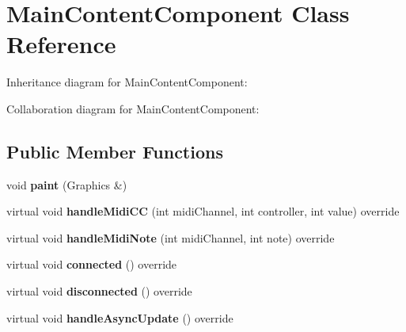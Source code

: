 \hypertarget{class_main_content_component}{}\section{Main\+Content\+Component Class Reference}
\label{class_main_content_component}


Inheritance diagram for Main\+Content\+Component\+:


Collaboration diagram for Main\+Content\+Component\+:
\subsection*{Public Member Functions}
\begin{DoxyCompactItemize}
\item 
void {\bfseries paint} (Graphics \&)\hypertarget{class_main_content_component_a897ff27920dedae2b120fe4e6a198815}{}\label{class_main_content_component_a897ff27920dedae2b120fe4e6a198815}

\item 
virtual void {\bfseries handle\+Midi\+CC} (int midi\+Channel, int controller, int value) override\hypertarget{class_main_content_component_a156f68ecd352b481d8ab6b9daeeb1917}{}\label{class_main_content_component_a156f68ecd352b481d8ab6b9daeeb1917}

\item 
virtual void {\bfseries handle\+Midi\+Note} (int midi\+Channel, int note) override\hypertarget{class_main_content_component_a45a06f0b1ac2b7f97d759f70be3cc1d8}{}\label{class_main_content_component_a45a06f0b1ac2b7f97d759f70be3cc1d8}

\item 
virtual void {\bfseries connected} () override\hypertarget{class_main_content_component_a17a320849296be1f080bb24d92c069e4}{}\label{class_main_content_component_a17a320849296be1f080bb24d92c069e4}

\item 
virtual void {\bfseries disconnected} () override\hypertarget{class_main_content_component_a06efe52a519e42c8f1170a3035a160d6}{}\label{class_main_content_component_a06efe52a519e42c8f1170a3035a160d6}

\item 
virtual void {\bfseries handle\+Async\+Update} () override\hypertarget{class_main_content_component_a9be726b895f68c0e9163d618ee4d20f6}{}\label{class_main_content_component_a9be726b895f68c0e9163d618ee4d20f6}


\end{DoxyCompactItemize}
